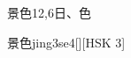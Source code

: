 \begin{entry}{景色}{12,6}{⽇、⾊}
  \begin{phonetics}{景色}{jing3se4}[][HSK 3]
  \end{phonetics}
\end{entry}

